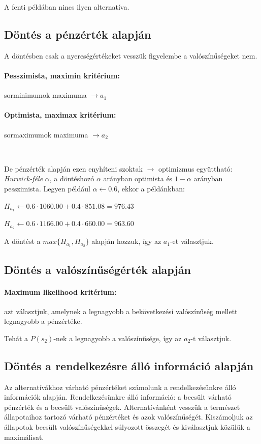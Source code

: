 \documentclass[a4paper,12pt]{article}
\begin{document}
A fenti példában nincs ilyen alternatíva.

\subsection{Döntés a pénzérték alapján}
\label{susec:penzert}
A döntésben csak a nyereségértékeket vesszük figyelembe a valószínűségeket nem.
\paragraph{Pesszimista, maximin kritérium:}  sorminimumok maximuma $\rightarrow a_1$
\paragraph{Optimista, maximax kritérium:}  sormaximumok maximuma $\rightarrow a_2$

\

De pénzérték alapján ezen enyhíteni szoktak $\rightarrow$ optimizmus együttható:
\emph{Hurwick-féle} $\alpha$, a döntéshozó $\alpha$ arányban optimista és $1-\alpha$ arányban pesszimista.
Legyen például $\alpha \gets 0.6$, ekkor a példánkban:
\begin{center}
$H_{a_1} \gets 0.6\cdot 1060.00 + 0.4\cdot 851.08 = 976.43$

$H_{a_2} \gets 0.6\cdot 1166.00 + 0.4\cdot 660.00 = 963.60$

\end{center}

A döntést a $max\{H_{a_1},H_{a_2}\}$ alapján hozzuk, így az $a_1$-et választjuk.

\subsection{Döntés a valószínűségérték alapján}
\label{susec:vaert}
\paragraph{Maximum likelihood kritérium: } azt választjuk, amelynek a legnagyobb a bekövetkezési valószínűség mellett legnagyobb a pénzértéke. 

Tehát a $P(s_2)$-nek a legnagyobb a valószínűsége, így az $a_2$-t választjuk.

\subsection{Döntés a rendelkezésre álló információ alapján}
Az alternatívákhoz várható pénzértéket számolunk a rendelkezésünkre álló információk alapján.
Rendelkezésünkre álló információ: a becsült várható pénzérték és a becsült valószínűségek.
Alternatívánként vesszük a természet állapotaihoz tartozó várható pénzértéket és azok valószínűségét.
Kiszámoljuk az állapotok becsült valószínűségekkel súlyozott összegét és kiválasztjuk közülük a maximálisat.
\end{document}
